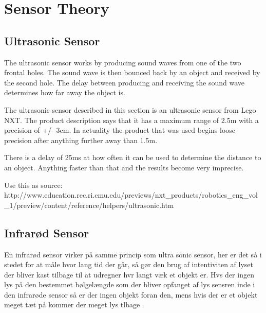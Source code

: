\chapter{Sensor Theory} 
\section{Ultrasonic Sensor}
The ultrasonic sensor works by producing sound waves from one of the two
frontal holes. The sound wave is then bounced back by an object and received by
the second hole. The delay between producing and receiving the sound wave
determines how far away the object is.

The ultrasonic sensor described in this section is an ultrasonic sensor from
Lego NXT. The product description says that it has a maximum range of 2.5m with
a precision of +/- 3cm. In actuality the product that was used begins loose
precision after anything further away than 1.5m.

There is a delay of 25ms at how often it can be used to determine the distance
to an object. Anything faster than that and the results become very imprecise.

Use this as source:
http://www.education.rec.ri.cmu.edu/previews/nxt_products/robotics_eng_vol_1/preview/content/reference/helpers/ultrasonic.htm

\section{Infrarød Sensor}
En infrarød sensor virker på samme princip som ultra sonic sensor, her er det så
i stedet for at måle hvor lang tid der går, så gør den brug af intentiviten af
lyset der bliver kast tilbage til at udregner hvr langt væk et objekt er. Hvs
der ingen lys på den bestemmet bølgelængde som der bliver opfanget af lys
sensren inde i den infrarøde sensor så er der ingen objekt foran den, mens hvis
der er et objekt meget tæt på kommer der meget lys tlbage \PS. 











